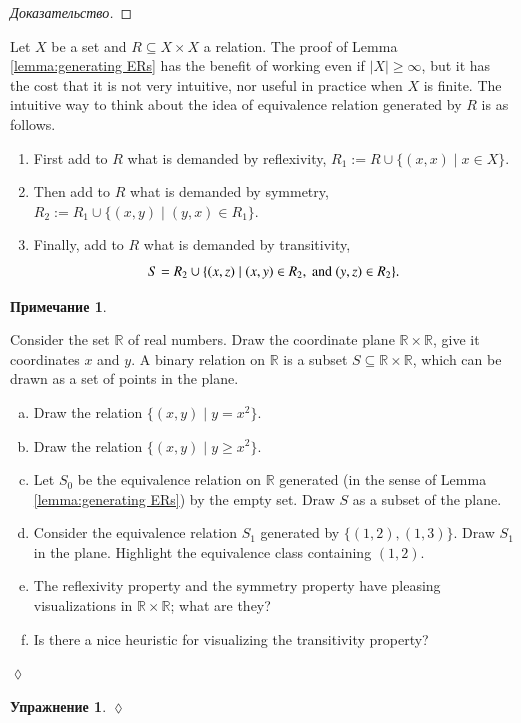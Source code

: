 \documentclass[a4paper]{book}
\def\tn{\textnormal}
\def\RR{{\mathbb R}}
\def\ss{\subseteq}
\def\|{{\;|\;}}
\theoremstyle{myth}
\newtheorem{remarkENG}[envENG]{\begin{english}Remark\end{english}}
\newtheorem{excENG}[envENG]{\begin{english}Exercise\end{english}}
\newenvironment{exerciseENG}{\begin{excENG}}{\hspace*{\fill}$\lozenge$\end{excENG}}
\newtheorem{remarkRUS}[envRUS]{Примечание}
\newtheorem{excRUS}[envRUS]{Упражнение}
\newenvironment{proofRUS}{\begin{proof}[Доказательство]}{\end{proof}}
\newenvironment{exerciseRUS}{\begin{excRUS}}{\hspace*{\fill}$\lozenge$\end{excRUS}}
\def\sexc{\begin{enumerate}[a.)]\setlength{\itemsep}{.1cm}\setlength{\parskip}{.1cm}\item}
\def\next{\item}
\def\endsexc{\end{enumerate}}
\begin{document}
\begin{russian}
\begin{proofRUS}
 
\end{proofRUS}

\begin{remarkENG}
Let $X$ be a set and $R\ss X\times X$ a relation. The proof of Lemma \ref{lemma:generating ERs} has the benefit of working even if $|X|\geq\infty$, but it has the cost that it is not very intuitive, nor useful in practice when $X$ is finite. The intuitive way to think about the idea of equivalence relation generated by $R$ is as follows.
\begin{enumerate}
\item First add to $R$ what is demanded by reflexivity, $R_1:=R\cup\{(x,x)\|x\in X\}$.
\item Then add to $R$ what is demanded by symmetry, $R_2:=R_1\cup\{(x,y)\|(y,x)\in R_1\}.$
\item Finally, add to $R$ what is demanded by transitivity, $$S=R_2\cup\{(x,z)\|(x,y)\in R_2, \tn{ and } (y,z)\in R_2\}.$$
\end{enumerate}
\end{remarkENG}

\begin{remarkRUS}
 
\end{remarkRUS}

\begin{exerciseENG}
Consider the set $\RR$ of real numbers. Draw the coordinate plane $\RR\times\RR$, give it coordinates $x$ and $y$. A binary relation on $\RR$ is a subset $S\ss\RR\times\RR$, which can be drawn as a set of points in the plane. 
\sexc Draw the relation $\{(x,y)\|y=x^2\}$. 
\next Draw the relation $\{(x,y)\|y\geq x^2\}.$
\next Let $S_0$ be the equivalence relation on $\RR$ generated (in the sense of Lemma \ref{lemma:generating ERs}) by the empty set. Draw $S$ as a subset of the plane.
\next Consider the equivalence relation $S_1$ generated by $\{(1,2),(1,3)\}$. Draw $S_1$ in the plane. Highlight the equivalence class containing $(1,2)$.
\next The reflexivity property and the symmetry property have pleasing visualizations in $\RR\times\RR$; what are they? 
\next Is there a nice heuristic for visualizing the transitivity property?
\endsexc
\end{exerciseENG}

\begin{exerciseRUS}
 
\end{exerciseRUS}


\end{russian}
\end{document}
